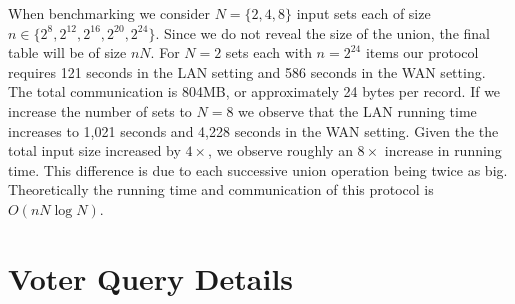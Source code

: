 \documentclass[11pt,letterpaper]{article}
\begin{document}
When benchmarking we consider $N=\{2,4,8\}$ input sets each of size $n\in \{2^8, 2^{12}, 2^{16}, 2^{20}, 2^{24}\}$. Since we do not reveal the size of the union, the final table will be of size $nN$. For $N=2$ sets each with $n=2^{24}$ items our protocol requires 121 seconds in the LAN setting and 586 seconds in the WAN setting. The total communication is 804MB, or approximately 24 bytes per record. If we increase the number of sets to $N=8$ we observe that the LAN running time increases to 1,021 seconds and 4,228 seconds  in the WAN setting. Given the the total input size increased by $4\times$, we observe roughly an $8\times$ increase in running time. This difference is due to each successive union operation being twice as big. Theoretically the running time and communication of this protocol is $O(nN\log N)$.

  




\appendix
\iffullversion
\else
\iffullversion
\else

\section{Voter Query Details}\label{sec:voterDetails}
\end{document}
